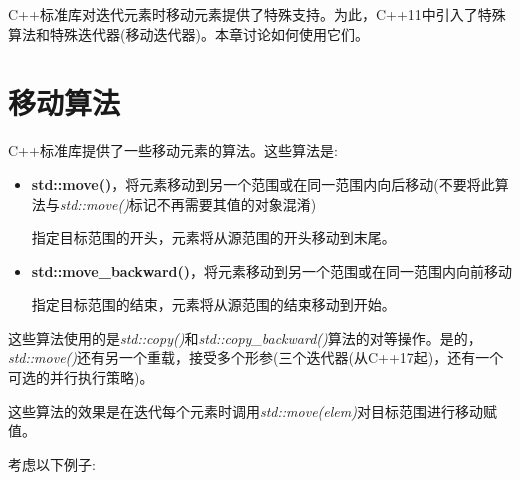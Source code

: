 
C++标准库对迭代元素时移动元素提供了特殊支持。为此，C++11中引入了特殊算法和特殊迭代器(移动迭代器)。本章讨论如何使用它们。\par


\section{移动算法}

C++标准库提供了一些移动元素的算法。这些算法是:\par

\begin{itemize}
  \item \textbf{std::move()}，将元素移动到另一个范围或在同一范围内向后移动(不要将此算法与\textit{std::move()}标记不再需要其值的对象混淆)\par
  指定目标范围的开头，元素将从源范围的开头移动到末尾。
  \item \textbf{std::\allowbreak{}move\_\allowbreak{}backward(\allowbreak{})\allowbreak{}}，将元素移动到另一个范围或在同一范围内向前移动\par
  指定目标范围的结束，元素将从源范围的结束移动到开始。
\end{itemize}

这些算法使用的是\textit{std::copy()}和\textit{std::\allowbreak{}copy\_\allowbreak{}backward(\allowbreak{})\allowbreak{}}算法的对等操作。是的，\textit{std::move()}还有另一个重载，接受多个形参(三个迭代器(从C++17起)，还有一个可选的并行执行策略)。\par

这些算法的效果是在迭代每个元素时调用\textit{std::\allowbreak{}move(\allowbreak{}elem)\allowbreak{}}对目标范围进行移动赋值。\par

考虑以下例子:\par

